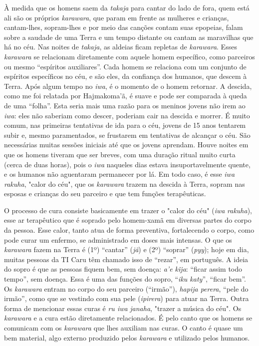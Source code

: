 À medida que os homens saem da \emph{takaja} para cantar do lado de
fora, quem está ali são os próprios \emph{karawara}, que param em frente
as mulheres e crianças, cantam-lhes, sopram-lhes e por meio das canções
contam suas epopeias, falam sobre a saudade de uma Terra e um tempo
distante ou cantam as maravilhas que há no céu. Nas noites de
\emph{takaja}, as aldeias ficam repletas de \emph{karawara}. Esses
\emph{karawara} se relacionam diretamente com aquele homem específico,
como parceiros ou mesmo ``espíritos auxiliares''. Cada homem se
relaciona com um conjunto de espíritos específicos no céu, e são eles,
da confiança dos humanos, que descem à Terra. Após algum tempo no
\emph{iwa}, é o momento de o homem retornar. A descida, como me foi
relatada por Hajmakoma'ã, é suave e pode ser comparada à queda de uma
``folha''. Esta seria mais uma razão para os meninos jovens não irem ao
\emph{iwa}: eles não saberiam como descer, poderiam cair na descida e
morrer. É muito comum, nas primeiras tentativas de ida para o céu,
jovens de 15 anos tentarem subir e, mesmo paramentados, se frustarem em
tentativas de alcançar o céu. São necessárias muitas sessões iniciais
até que os jovens aprendam. Houve noites em que os homens tiveram que
ser breves, com uma duração ritual muito curta (cerca de duas horas),
pois o \emph{iwa} naqueles dias estava insuportavelmente quente, e os
humanos não aguentaram permanecer por lá. Em todo caso, é esse \emph{iwa
rakuha}, "calor do céu", que os \emph{karawara} trazem na descida à
Terra, sopram nas esposas e crianças do seu parceiro e que tem funções
terapêuticas.

O processo de cura consiste basicamente em trazer o "calor do céu"
(\emph{iwa} \emph{rakuha}), esse ar terapêutico que é soprado pelo
homem-xamã em diversas partes do corpo da pessoa. Esse calor, tanto atua
de forma preventiva, fortalecendo o corpo, como pode curar um enfermo,
se administrado em doses mais intensas. O que os \emph{karawara} fazem
na Terra é (1º) ``cantar'' (\emph{jã}) e (2º) ``soprar'' (\emph{pyy});
hoje em dia, muitas pessoas da TI Caru têm chamado isso de ``rezar'', em
português. A ideia do sopro é que as pessoas fiquem bem, sem doença:
\emph{a'e kĩja}: ``ficar assim todo tempo'', sem doença. Essa é uma das
funções do sopro, ``\emph{iku katy}'', ``ficar bem''. Os \emph{karawara}
entram no corpo do seu parceiro (``irmão''), \emph{hapija perera},
``pele do irmão'', como que se vestindo com sua pele (\emph{ipirera})
para atuar na Terra. Outra forma de mencionar essas curas é \emph{ru
iwa} \emph{janaha}, "trazer a música do céu". Os \emph{karawara} e a
cura estão diretamente relacionados. É pelo canto que os homens se
comunicam com os \emph{karawara} que lhes auxiliam nas curas. O canto é
quase um bem material, algo externo produzido pelos \emph{karawara} e
utilizado pelos humanos.

